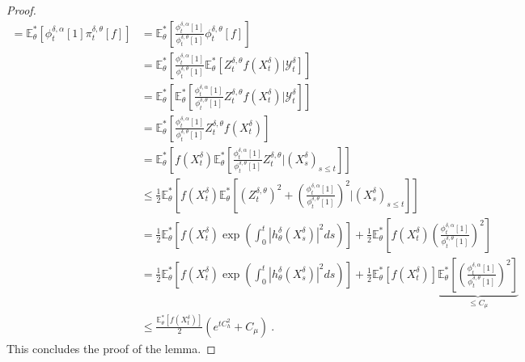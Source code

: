 \documentclass{article}
\begin{document}
\begin{proof}
\begin{align*}
=\mathbb E_\theta^*\left[\phi_t^{\delta,\alpha}[1]\pi_t^{\delta,\theta}[f]\right]&=
\mathbb E_\theta^*\left[\frac{\phi_t^{\delta,\alpha}[1]}{\phi_t^{\delta,\theta}[1]}\phi_t^{\delta,\theta}[f]\right]\\
&=\mathbb E_\theta^*\left[\frac{\phi_t^{\delta,\alpha}[1]}{\phi_t^{\delta,\theta}[1]}\mathbb E_\theta^*\left[Z_t^{\delta,\theta}f(X_t^\delta)\Big|\mathcal Y_t^\delta\right]\right]\\
&=\mathbb E_\theta^*\left[\mathbb E_\theta^*\left[\frac{\phi_t^{\delta,\alpha}[1]}{\phi_t^{\delta,\theta}[1]}Z_t^{\delta,\theta}f(X_t^\delta)\Big|\mathcal Y_t^\delta\right]\right]\\
&=\mathbb E_\theta^*\left[\frac{\phi_t^{\delta,\alpha}[1]}{\phi_t^{\delta,\theta}[1]}Z_t^{\delta,\theta}f(X_t^\delta)\right]\\
&=\mathbb E_\theta^*\left[f(X_t^\delta)\mathbb E_\theta^*\left[\frac{\phi_t^{\delta,\alpha}[1]}{\phi_t^{\delta,\theta}[1]}Z_t^{\delta,\theta}\Big|( X_s^\delta)_{s\leq t}\right]\right]\\
&\leq\frac 12\mathbb E_\theta^*\left[f(X_t^\delta)\mathbb E_\theta^*\left[\left(Z_t^{\delta,\theta}\right)^2+\left(\frac{\phi_t^{\delta,\alpha}[1]}{\phi_t^{\delta,\theta}[1]}\right)^2\Big|(X_s^\delta)_{s\leq t}\right]\right]\\
&=\frac 12\mathbb E_\theta^*\left[f(X_t^\delta)\exp\left(\int_0^t|h_\theta^\delta(X_s^\delta)|^2ds\right)\right]+\frac 12\mathbb E_\theta^*\left[f(X_t^\delta)\left(\frac{\phi_t^{\delta,\alpha}[1]}{\phi_t^{\delta,\theta}[1]}\right)^2\right]\\
&=\frac 12\mathbb E_\theta^*\left[f(X_t^\delta)\exp\left(\int_0^t|h_\theta^\delta(X_s^\delta)|^2ds\right)\right]+\frac 12\mathbb E_\theta^*\left[f(X_t^\delta)\right]\underbrace{\mathbb E_\theta^*\left[\left(\frac{\phi_t^{\delta,\alpha}[1]}{\phi_t^{\delta,\theta}[1]}\right)^2\right]}_{\leq C_\mu}\\
&\leq  \frac{\mathbb E_\theta^*\left[f(X_t^\delta)\right]}{2}\left(e^{tC_h^2 }+C_\mu\right)\ .
\end{align*}
This concludes the proof of the lemma.
\end{proof}
\end{document}
